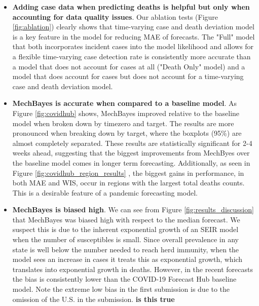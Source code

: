 \documentclass[11pt]{amsart}
\begin{document}
\begin{itemize}
\item \textbf{Adding case data when predicting deaths is helpful but only when accounting for data quality issues}. Our ablation tests (Figure \ref{fig:ablation}) clearly shows that time-varying case and death deviation model is a key feature in the model for reducing MAE of forecasts. The "Full" model that both incorporates incident cases into the model likelihood and allows for a flexible time-varying case detection rate is consistently more accurate than a model that does not account for cases at all ("Death Only" model) and a model that does account for cases but does not account for a time-varying case and death deviation model.


\item \textbf{MechBayes is accurate when compared to a baseline model}. As Figure \ref{fig:covidhub} shows, MechBayes improved relative to the baseline model when broken down by timezero and target. The results are more pronounced when breaking down by target, where the boxplots (95\%) are almost completely separated. These results are statistically significant for 2-4 weeks ahead, suggesting that the biggest improvements from MechByes over the baseline model comes in longer term forecasting.  Additionally, as seen in Figure \ref{fig:covidhub_region_results} , the biggest gains in performance, in both MAE and WIS, occur in regions with the largest total deaths counts. This is a desirable feature of a pandemic forecasting model. 


\item \textbf{MechBayes is biased high}. We can see from Figure \ref{fig:results_discussion} that MechBayes was biased high with respect to the median forecast. We suspect this is due to the inherent exponential growth of an SEIR model when the number of susceptibles is small. Since overall prevalence in any state is well below the number needed to reach herd immunity, when the model sees an increase in cases it treats this as exponential growth, which translates into exponential growth in deaths. However, in the recent forecasts the bias is consistently lower than the COVID-19 Forecast Hub baseline model. Note the extreme low bias in the first submission is due to the omission of the U.S. in the submission. \textbf{is this true} 


\end{itemize}
\end{document}

